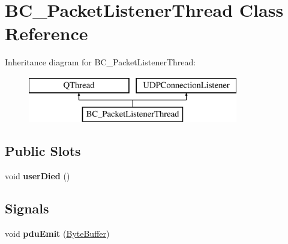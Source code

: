 \hypertarget{class_b_c___packet_listener_thread}{}\section{B\+C\+\_\+\+Packet\+Listener\+Thread Class Reference}
\label{class_b_c___packet_listener_thread}
Inheritance diagram for B\+C\+\_\+\+Packet\+Listener\+Thread\+:\begin{figure}[H]
\begin{center}
\leavevmode
\includegraphics[height=2.000000cm]{class_b_c___packet_listener_thread}
\end{center}
\end{figure}
\subsection*{Public Slots}
\begin{DoxyCompactItemize}
\item 
void {\bfseries user\+Died} ()\hypertarget{class_b_c___packet_listener_thread_a8e64484e475cb1b1f125ab670abbfcaa}{}\label{class_b_c___packet_listener_thread_a8e64484e475cb1b1f125ab670abbfcaa}

\end{DoxyCompactItemize}
\subsection*{Signals}
\begin{DoxyCompactItemize}
\item 
void {\bfseries pdu\+Emit} (\hyperlink{classisat__utils_1_1_byte_buffer}{Byte\+Buffer})\hypertarget{class_b_c___packet_listener_thread_a397607b1bd8c9ae5fcaae3b8c7e92a0c}{}\label{class_b_c___packet_listener_thread_a397607b1bd8c9ae5fcaae3b8c7e92a0c}

\end{DoxyCompactItemize}
